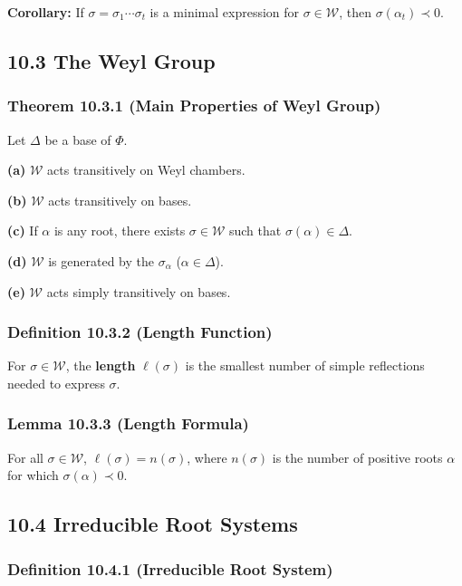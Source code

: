 \textbf{Corollary:} If $\sigma = \sigma_1 \cdots \sigma_t$ is a minimal expression for $\sigma \in \mathcal{W}$, then $\sigma(\alpha_t) \prec 0$.

\subsection{10.3 The Weyl Group}

\subsubsection{Theorem 10.3.1 (Main Properties of Weyl Group)}

Let $\Delta$ be a base of $\Phi$.

\textbf{(a)} $\mathcal{W}$ acts transitively on Weyl chambers.

\textbf{(b)} $\mathcal{W}$ acts transitively on bases.

\textbf{(c)} If $\alpha$ is any root, there exists $\sigma \in \mathcal{W}$ such that $\sigma(\alpha) \in \Delta$.

\textbf{(d)} $\mathcal{W}$ is generated by the $\sigma_\alpha$ ($\alpha \in \Delta$).

\textbf{(e)} $\mathcal{W}$ acts simply transitively on bases.

\subsubsection{Definition 10.3.2 (Length Function)}

For $\sigma \in \mathcal{W}$, the \textbf{length} $\ell(\sigma)$ is the smallest number of simple reflections needed to express $\sigma$.

\subsubsection{Lemma 10.3.3 (Length Formula)}

For all $\sigma \in \mathcal{W}$, $\ell(\sigma) = n(\sigma)$, where $n(\sigma)$ is the number of positive roots $\alpha$ for which $\sigma(\alpha) \prec 0$.

\subsection{10.4 Irreducible Root Systems}

\subsubsection{Definition 10.4.1 (Irreducible Root System)}

